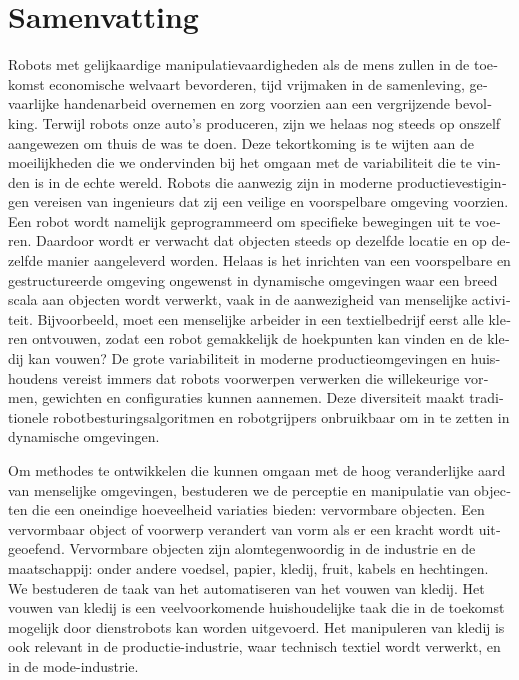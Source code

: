 \documentclass[\home/main.tex]{subfiles}
\begin{document}
\chapter{Samenvatting}

\begin{otherlanguage}{dutch}

Robots met gelijkaardige manipulatievaardigheden als de mens zullen in de toekomst economische welvaart bevorderen, tijd vrijmaken in de samenleving, gevaarlijke handenarbeid overnemen en zorg voorzien aan een vergrijzende bevolking. 
Terwijl robots onze auto's produceren, zijn we helaas nog steeds op onszelf aangewezen om thuis de was te doen.
Deze tekortkoming is te wijten aan de moeilijkheden die we ondervinden bij het omgaan met de variabiliteit die te vinden is in de echte wereld.
Robots die aanwezig zijn in moderne productievestigingen vereisen van ingenieurs dat zij een veilige en voorspelbare omgeving voorzien. Een robot wordt namelijk geprogrammeerd om specifieke bewegingen uit te voeren. Daardoor wordt er verwacht dat objecten steeds op dezelfde locatie en op dezelfde manier aangeleverd worden.
Helaas is het inrichten van een voorspelbare en gestructureerde omgeving ongewenst in dynamische omgevingen waar een breed scala aan objecten wordt verwerkt, vaak in de aanwezigheid van menselijke activiteit. Bijvoorbeeld, moet een menselijke arbeider in een textielbedrijf eerst alle kleren ontvouwen, zodat een robot gemakkelijk de hoekpunten kan vinden en de kledij kan vouwen?
De grote variabiliteit in moderne productieomgevingen en huishoudens vereist immers dat robots voorwerpen verwerken die willekeurige vormen, gewichten en configuraties kunnen aannemen. Deze diversiteit maakt traditionele robotbesturingsalgoritmen en robotgrijpers onbruikbaar om in te zetten in dynamische omgevingen.

Om methodes te ontwikkelen die kunnen omgaan met de hoog veranderlijke aard van menselijke omgevingen, bestuderen we de perceptie en manipulatie van objecten die een oneindige hoeveelheid variaties bieden: vervormbare objecten. Een vervormbaar object of voorwerp verandert van vorm als er een kracht wordt uitgeoefend. Vervormbare objecten zijn alomtegenwoordig in de industrie en de maatschappij: onder andere voedsel, papier, kledij, fruit, kabels en hechtingen. We bestuderen de taak van het automatiseren van het vouwen van kledij. Het vouwen van kledij is een veelvoorkomende huishoudelijke taak die in de toekomst mogelijk door dienstrobots kan worden uitgevoerd. Het manipuleren van kledij is ook relevant in de productie-industrie, waar technisch textiel wordt verwerkt, en in de mode-industrie.


\end{otherlanguage}
\end{document}
